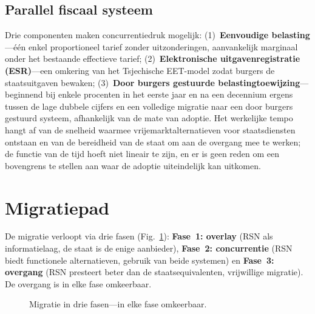 \documentclass[11pt,a4paper,twocolumn]{article}
\begin{document}
\subsection{Parallel fiscaal systeem}

Drie componenten maken concurrentiedruk mogelijk: (1)~\textbf{Eenvoudige belasting}---één enkel proportioneel tarief zonder uitzonderingen, aanvankelijk marginaal onder het bestaande effectieve tarief; (2)~\textbf{Elektronische uitgavenregistratie (ESR)}---een omkering van het Tsjechische EET-model zodat burgers de staatsuitgaven bewaken; (3)~\textbf{Door burgers gestuurde belastingtoewijzing}---beginnend bij enkele procenten in het eerste jaar en na een decennium ergens tussen de lage dubbele cijfers en een volledige migratie naar een door burgers gestuurd systeem, afhankelijk van de mate van adoptie. Het werkelijke tempo hangt af van de snelheid waarmee vrijemarktalternatieven voor staatsdiensten ontstaan en van de bereidheid van de staat om aan de overgang mee te werken; de functie van de tijd hoeft niet lineair te zijn, en er is geen reden om een bovengrens te stellen aan waar de adoptie uiteindelijk kan uitkomen.

\section{Migratiepad}

De migratie verloopt via drie fasen (Fig.~\ref{fig:migration}): \textbf{Fase~1: overlay} (RSN als informatielaag, de staat is de enige aanbieder), \textbf{Fase~2: concurrentie} (RSN biedt functionele alternatieven, gebruik van beide systemen) en \textbf{Fase~3: overgang} (RSN presteert beter dan de staatsequivalenten, vrijwillige migratie). De overgang is in elke fase omkeerbaar.

\begin{figure}[ht]
\centering
{}
\caption{Migratie in drie fasen---in elke fase omkeerbaar.}
\label{fig:migration}
\end{figure}
\end{document}
